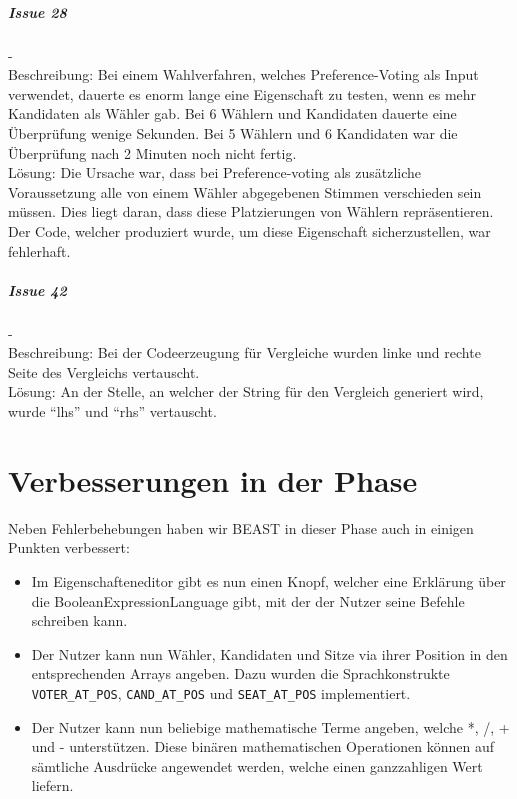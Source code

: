 \documentclass[a4paper]{scrreprt}
\begin{document}
\paragraph{Issue 28}- \\
Beschreibung: Bei einem Wahlverfahren, welches Preference-Voting als Input verwendet, dauerte es enorm lange eine Eigenschaft zu testen, wenn es mehr Kandidaten als Wähler gab. Bei 6 Wählern und Kandidaten dauerte eine Überprüfung wenige Sekunden. Bei 5 Wählern und 6 Kandidaten war die Überprüfung nach 2 Minuten noch nicht fertig.\\
Lösung: Die Ursache war, dass bei Preference-voting als zusätzliche Voraussetzung alle von einem Wähler abgegebenen Stimmen verschieden sein müssen. Dies liegt daran, dass diese Platzierungen von Wählern repräsentieren. Der Code, welcher produziert wurde, um diese Eigenschaft sicherzustellen, war fehlerhaft.

\paragraph{Issue 42}- \\
Beschreibung: Bei der Codeerzeugung für Vergleiche wurden linke und rechte Seite des Vergleichs vertauscht.\\
Lösung: An der Stelle, an welcher der String für den Vergleich generiert wird, wurde "`lhs"' und "`rhs"' vertauscht. 
 


\chapter{Verbesserungen in der Phase}
Neben Fehlerbehebungen haben wir BEAST in dieser Phase auch in einigen Punkten
verbessert:

\begin{itemize}
  \item Im Eigenschafteneditor gibt es nun einen Knopf, welcher eine Erklärung
  über die BooleanExpressionLanguage gibt, mit der der Nutzer seine Befehle
  schreiben kann.
  \item Der Nutzer kann nun Wähler, Kandidaten und Sitze via ihrer Position in den entsprechenden Arrays angeben. Dazu wurden die Sprachkonstrukte \verb!VOTER_AT_POS!, \verb!CAND_AT_POS! und \verb!SEAT_AT_POS! implementiert.
  \item Der Nutzer kann nun beliebige mathematische Terme angeben, welche *, /, + und - unterstützen. Diese binären mathematischen Operationen können auf sämtliche Ausdrücke angewendet werden, welche einen ganzzahligen Wert liefern.
\end{itemize}
\end{document}
